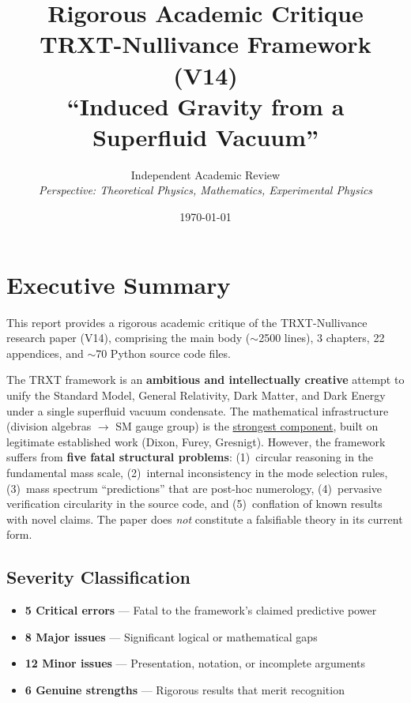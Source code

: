 \documentclass[12pt, a4paper]{article}
\title{\textbf{Rigorous Academic Critique}\\[6pt]
\large TRXT-Nullivance Framework (V14)\\
``Induced Gravity from a Superfluid Vacuum''}
\author{Independent Academic Review\\
\textit{Perspective: Theoretical Physics, Mathematics, Experimental Physics}}
\date{\today}
\begin{document}
\maketitle
\tableofcontents
\newpage

\section{Executive Summary}

This report provides a rigorous academic critique of the TRXT-Nullivance research paper (V14), comprising the main body ($\sim$2500 lines), 3 chapters, 22 appendices, and $\sim$70 Python source code files.

\begin{tcolorbox}[colback=red!5!white, colframe=red!50!black, title=Overall Assessment]
The TRXT framework is an \textbf{ambitious and intellectually creative} attempt to unify the Standard Model, General Relativity, Dark Matter, and Dark Energy under a single superfluid vacuum condensate. The mathematical infrastructure (division algebras $\to$ SM gauge group) is the \underline{strongest component}, built on legitimate established work (Dixon, Furey, Gresnigt). However, the framework suffers from \textbf{five fatal structural problems}: (1)~circular reasoning in the fundamental mass scale, (2)~internal inconsistency in the mode selection rules, (3)~mass spectrum ``predictions'' that are post-hoc numerology, (4)~pervasive verification circularity in the source code, and (5)~conflation of known results with novel claims. The paper does \emph{not} constitute a falsifiable theory in its current form.
\end{tcolorbox}

\subsection{Severity Classification}
\begin{itemize}
    \item \textbf{5 Critical errors} --- Fatal to the framework's claimed predictive power
    \item \textbf{8 Major issues} --- Significant logical or mathematical gaps
    \item \textbf{12 Minor issues} --- Presentation, notation, or incomplete arguments
    \item \textbf{6 Genuine strengths} --- Rigorous results that merit recognition
\end{itemize}
\end{document}
